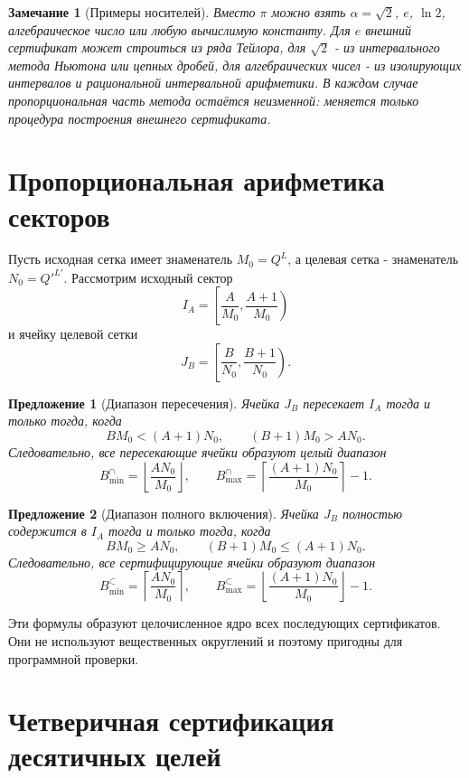 \documentclass[11pt,a4paper]{article}
\newtheorem{proposition}{Предложение}
\newtheorem{remark}{Замечание}
\begin{document}
\begin{remark}[Примеры носителей]
Вместо $\pi$ можно взять $\alpha=\sqrt2$, $e$, $\ln2$, алгебраическое число или любую вычислимую константу.  Для $e$ внешний сертификат может строиться из ряда Тейлора, для $\sqrt2$ - из интервального метода Ньютона или цепных дробей, для алгебраических чисел - из изолирующих интервалов и рациональной интервальной арифметики.  В каждом случае пропорциональная часть метода остаётся неизменной: меняется только процедура построения внешнего сертификата.
\end{remark}

\section{Пропорциональная арифметика секторов}

Пусть исходная сетка имеет знаменатель $M_0=Q^L$, а целевая сетка - знаменатель $N_0=Q'^{L'}$.  Рассмотрим исходный сектор
\[
  I_A=\left[\frac{A}{M_0},\frac{A+1}{M_0}\right)
\]
и ячейку целевой сетки
\[
  J_B=\left[\frac{B}{N_0},\frac{B+1}{N_0}\right).
\]

\begin{proposition}[Диапазон пересечения]
Ячейка $J_B$ пересекает $I_A$ тогда и только тогда, когда
\[
  B M_0 < (A+1)N_0,
  \qquad
  (B+1)M_0 > A N_0.
\]
Следовательно, все пересекающие ячейки образуют целый диапазон
\[
  B_{\min}^{\cap}=\left\lfloor\frac{A N_0}{M_0}\right\rfloor,
  \qquad
  B_{\max}^{\cap}=\left\lceil\frac{(A+1)N_0}{M_0}\right\rceil-1.
\]
\end{proposition}

\begin{proposition}[Диапазон полного включения]
Ячейка $J_B$ полностью содержится в $I_A$ тогда и только тогда, когда
\[
  B M_0\ge A N_0,
  \qquad
  (B+1)M_0\le (A+1)N_0.
\]
Следовательно, все сертифицирующие ячейки образуют диапазон
\[
  B_{\min}^{\subset}=\left\lceil\frac{A N_0}{M_0}\right\rceil,
  \qquad
  B_{\max}^{\subset}=\left\lfloor\frac{(A+1)N_0}{M_0}\right\rfloor-1.
\]
\end{proposition}

Эти формулы образуют целочисленное ядро всех последующих сертификатов.  Они не используют вещественных округлений и поэтому пригодны для программной проверки.

\section{Четверичная сертификация десятичных целей}
\end{document}
